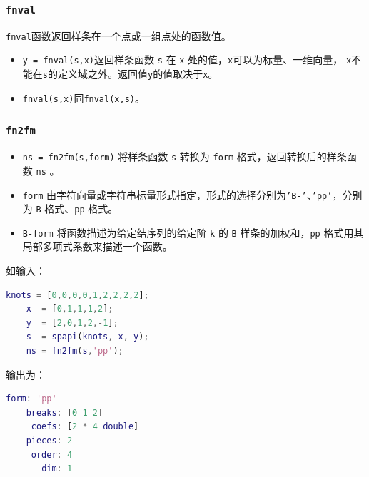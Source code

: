 \subsubsection{\texttt{fnval}}

\texttt{fnval}函数返回样条在一个点或一组点处的函数值。

\begin{itemize}
    \item \texttt{y = fnval(s,x)}返回样条函数 \texttt{s} 在 \texttt{x} 处的值，\texttt{x}可以为标量、一维向量，
            \texttt{x}不能在\texttt{s}的定义域之外。返回值\texttt{y}的值取决于\texttt{x}。
    \item \texttt{fnval(s,x)}同\texttt{fnval(x,s)}。
\end{itemize}


\subsubsection{\texttt{fn2fm}}

\begin{itemize}
    \item \texttt{ns = fn2fm(s,form)} 将样条函数 \texttt{s} 转换为 \texttt{form} 格式，返回转换后的样条函数 \texttt{ns} 。 
    \item \texttt{form} 由字符向量或字符串标量形式指定，形式的选择分别为\texttt{'B-'}、\texttt{'pp'}，分别为 \texttt{B} 格式、\texttt{pp} 格式。
    \item \texttt{B-form} 将函数描述为给定结序列的给定阶 \texttt{k} 的 \texttt{B} 样条的加权和，\texttt{pp} 格式用其局部多项式系数来描述一个函数。

\end{itemize}

如输入：
\begin{lstlisting}[language = matlab]
    knots = [0,0,0,0,1,2,2,2,2];
    x  = [0,1,1,1,2];
    y  = [2,0,1,2,-1];
    s  = spapi(knots, x, y);
    ns = fn2fm(s,'pp');
\end{lstlisting}

 输出为：
\begin{lstlisting}[language = matlab ]
      form: 'pp'
    breaks: [0 1 2]
     coefs: [2 * 4 double]
    pieces: 2
     order: 4
       dim: 1
\end{lstlisting}
